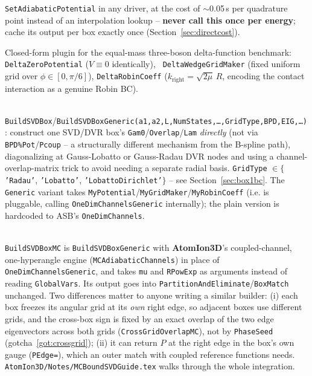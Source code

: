 \documentclass[11pt]{article}
\newcommand{\file}[1]{\texttt{#1}}
\newcommand{\sub}[1]{\texttt{#1}}
\newcommand{\repo}[1]{\textbf{#1}}
\begin{document}
\begin{description}
  \sub{SetAdiabaticPotential} in any driver, at the cost of $\sim$0.05\,s per quadrature point
  instead of an interpolation lookup -- \textbf{never call this once per energy}; cache its output
  per box exactly once (Section~\ref{sec:directcost}).
\item[\file{DeltaFunctionPlugins.f90}] Closed-form plugin for the equal-mass three-boson
  delta-function benchmark: \sub{DeltaZeroPotential} ($V\equiv0$ identically), \sub{
  DeltaWedgeGridMaker} (fixed uniform grid over $\phi\in[0,\pi/6]$), \sub{DeltaRobinCoeff}
  ($k_{\text{right}}=\sqrt{2\mu}\,R$, encoding the contact interaction as a genuine Robin BC).
\item[\file{SVDChannelBasis.f90} / \file{GenericSVDChannelBasis.f90}] \hfill \\
  \sub{BuildSVDBox}/\sub{BuildSVDBoxGeneric(a1,a2,L,NumStates,\ldots,GridType,BPD,EIG,\ldots)}:
  construct one SVD/DVR box's \texttt{Gam0}/\texttt{Overlap}/\texttt{Lam} \emph{directly} (not via
  \texttt{BPD\%Pot}/\texttt{Pcoup} -- a structurally different mechanism from the B-spline path),
  diagonalizing at Gauss-Lobatto or Gauss-Radau DVR nodes and using a channel-overlap-matrix trick
  to avoid needing a separate radial basis. \texttt{GridType} $\in\{$\texttt{'Radau'},
  \texttt{'Lobatto'}, \texttt{'LobattoDirichlet'}$\}$ -- see Section~\ref{sec:box1bc}. The
  \texttt{Generic} variant takes \texttt{MyPotential}/\texttt{MyGridMaker}/\texttt{MyRobinCoeff}
  (i.e. is pluggable, calling \sub{OneDimChannelsGeneric} internally); the plain version is
  hardcoded to ASB's \sub{OneDimChannels}.
\item[\file{AtomIon3D/SVDBoxMC.f90} -- multichannel SVD boxes (external consumer)] \hfill \\
  \sub{BuildSVDBoxMC} is \sub{BuildSVDBoxGeneric} with \repo{AtomIon3D}'s coupled-channel,
  one-hyperangle engine (\sub{MCAdiabaticChannels}) in place of \sub{OneDimChannelsGeneric}, and
  takes \texttt{mu} and \texttt{RPowExp} as arguments instead of reading \texttt{GlobalVars}. Its
  output goes into \sub{PartitionAndEliminate}/\sub{BoxMatch} unchanged. Two differences matter to
  anyone writing a similar builder: (i) each box freezes its angular grid at its \emph{own} right
  edge, so adjacent boxes use different grids, and the cross-box sign is fixed by an exact overlap
  of the two edge eigenvectors across both grids (\sub{CrossGridOverlapMC}), not by
  \texttt{PhaseSeed} (gotcha~\ref{got:crossgrid}); (ii) it can return $P$ at the right edge in the
  box's own gauge (\texttt{PEdge=}), which an outer match with coupled reference functions needs.
  \file{AtomIon3D/Notes/MCBoundSVDGuide.tex} walks through the whole integration.
\end{description}
\end{document}
